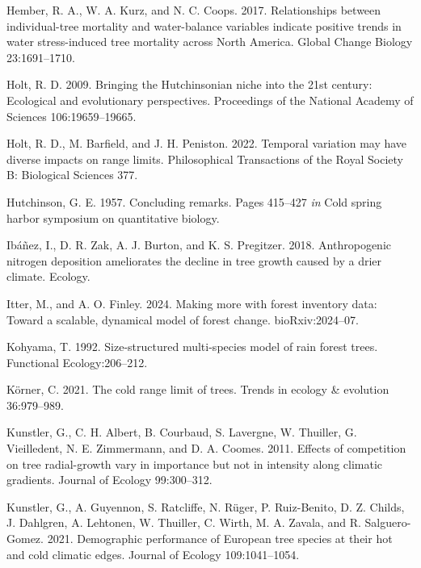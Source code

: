 \documentclass[12pt]{article}
\newlength{\cslhangindent}
\newenvironment{cslreferences}%
  {\setlength{\parindent}{0pt}%
  \everypar{\setlength{\hangindent}{\cslhangindent}}\ignorespaces}%
  {\par}
\begin{document}
\begin{cslreferences}
\leavevmode\hypertarget{ref-Hember2017}{}%
Hember, R. A., W. A. Kurz, and N. C. Coops. 2017. Relationships between
individual-tree mortality and water-balance variables indicate positive
trends in water stress-induced tree mortality across North America.
Global Change Biology 23:1691--1710.

\leavevmode\hypertarget{ref-Holt2009}{}%
Holt, R. D. 2009. Bringing the Hutchinsonian niche into the 21st
century: Ecological and evolutionary perspectives. Proceedings of the
National Academy of Sciences 106:19659--19665.

\leavevmode\hypertarget{ref-Holt2022}{}%
Holt, R. D., M. Barfield, and J. H. Peniston. 2022. Temporal variation
may have diverse impacts on range limits. Philosophical Transactions of
the Royal Society B: Biological Sciences 377.

\leavevmode\hypertarget{ref-Hutchinson1957}{}%
Hutchinson, G. E. 1957. Concluding remarks. Pages 415--427 \emph{in}
Cold spring harbor symposium on quantitative biology.

\leavevmode\hypertarget{ref-Ibanez2018}{}%
Ibáñez, I., D. R. Zak, A. J. Burton, and K. S. Pregitzer. 2018.
Anthropogenic nitrogen deposition ameliorates the decline in tree growth
caused by a drier climate. Ecology.

\leavevmode\hypertarget{ref-itter2024making}{}%
Itter, M., and A. O. Finley. 2024. Making more with forest inventory
data: Toward a scalable, dynamical model of forest change.
bioRxiv:2024--07.

\leavevmode\hypertarget{ref-kohyama1992}{}%
Kohyama, T. 1992. Size-structured multi-species model of rain forest
trees. Functional Ecology:206--212.

\leavevmode\hypertarget{ref-Korner2021}{}%
Körner, C. 2021. The cold range limit of trees. Trends in ecology \&
evolution 36:979--989.

\leavevmode\hypertarget{ref-Kunstler2011a}{}%
Kunstler, G., C. H. Albert, B. Courbaud, S. Lavergne, W. Thuiller, G.
Vieilledent, N. E. Zimmermann, and D. A. Coomes. 2011. Effects of
competition on tree radial-growth vary in importance but not in
intensity along climatic gradients. Journal of Ecology 99:300--312.

\leavevmode\hypertarget{ref-Kunstler2021}{}%
Kunstler, G., A. Guyennon, S. Ratcliffe, N. Rüger, P. Ruiz-Benito, D. Z.
Childs, J. Dahlgren, A. Lehtonen, W. Thuiller, C. Wirth, M. A. Zavala,
and R. Salguero-Gomez. 2021. Demographic performance of European tree
species at their hot and cold climatic edges. Journal of Ecology
109:1041--1054.


\end{cslreferences}
\end{document}
